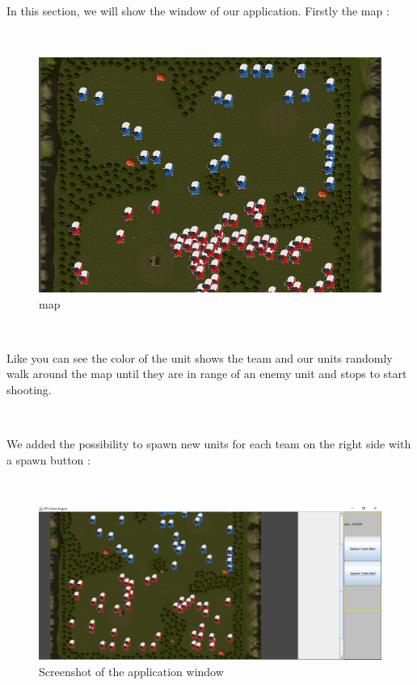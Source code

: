 \documentclass[a4paper,10pt]{book}
\begin{document}
~

In this section, we will show the window of our application. Firstly the map :

~

\begin{figure}[h]
 \centering
 \includegraphics[scale=0.5]{GUI2}
 \caption{map}
\end{figure}

~

Like you can see the color of the unit shows the team and our units randomly walk around the map until they are in range of an enemy unit and stops to start shooting.

~

We added the possibility to spawn new units for each team on the right side with a spawn button :

~

\begin{figure}[h]
 \centering
 \includegraphics[scale=0.5]{GUI3}
 \caption{Screenshot of the application window}
\end{figure}

\newpage
\end{document}
